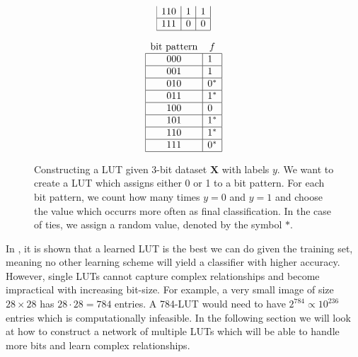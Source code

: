 \begin{figure}[!htb]
\begin{minipage}{.95\linewidth}
\begin{minipage}[b]{.4\linewidth}
\begin{align*}
\begin{array}{ccc}
        \multicolumn{1}{|c|}{110} & \multicolumn{1}{c|}{1} & \multicolumn{1}{c|}{1}                \\ \hline
        \multicolumn{1}{|c|}{111} & \multicolumn{1}{c|}{0} & \multicolumn{1}{c|}{0}                \\ \hline
      \end{array}
    \end{align*}
  \end{minipage}
  \begin{minipage}[b]{.3\linewidth}\centering
    \begin{align*}
      \begin{array}{cc}
        \text{bit pattern}        & f                  \\ \hline
        \multicolumn{1}{|c|}{000} & \multicolumn{1}{l|}{1}   \\ \hline
        \multicolumn{1}{|c|}{001} & \multicolumn{1}{l|}{1}   \\ \hline
        \multicolumn{1}{|c|}{010} & \multicolumn{1}{l|}{0^*} \\ \hline
        \multicolumn{1}{|c|}{011} & \multicolumn{1}{l|}{1^*} \\ \hline
        \multicolumn{1}{|c|}{100} & \multicolumn{1}{l|}{0}   \\ \hline
        \multicolumn{1}{|c|}{101} & \multicolumn{1}{l|}{1^*}  \\ \hline
        \multicolumn{1}{|c|}{110} & \multicolumn{1}{l|}{1^*}  \\ \hline
        \multicolumn{1}{|c|}{111} & \multicolumn{1}{l|}{0^*} \\ \hline
      \end{array}
    \end{align*}
  \end{minipage}
  \caption{Constructing a LUT given 3-bit dataset $\bm{X}$ with labels $y$. We want to create a LUT which assigns either 0 or 1 to a bit pattern. For each bit pattern, we count how many times $y=0$ and $y=1$ and choose the value which occurrs more often as final classification. In the case of ties, we assign a random value, denoted by the symbol $*$.}
  \label{ex:1}
\end{minipage}
  \normalfont
  \end{figure}

\noindent In \cite{chatterjee2018learning}, it is shown that a learned LUT is the best we can do given the training set, meaning no other learning scheme will yield a classifier with higher accuracy. However, single LUTs cannot capture complex relationships and become impractical with increasing bit-size. For example, a very small image of size $28 \times 28$ has $28 \cdot 28 = 784$ entries. A 784-LUT would need to have $2^{784} \propto 10^{236}$ entries which is computationally infeasible. In the following section we will look at how to construct a network of multiple LUTs which will be able to handle more bits and learn complex relationships.

